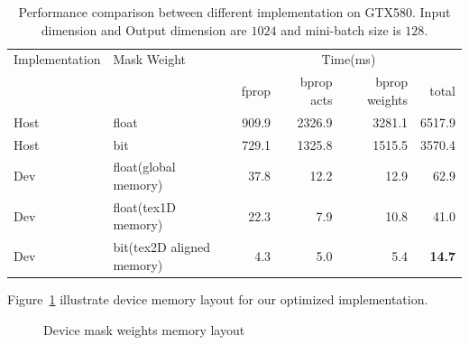 \documentclass[9pt]{article}
\begin{document}
\begin{table}[ht]
    \begin{center}
        \label{tab:imp_time}
        \begin{tabular}{|l|l|r|r|r|r|}
            \hline
            Implementation & Mask Weight& \multicolumn{4}{c|}{Time(ms)} \\
            \cline{3-6}
                           &            &     fprop & bprop acts & bprop weights & total \\
            \hline 
            Host & float & 909.9  & 2326.9  & 3281.1  & 6517.9  \\
            Host & bit   & 729.1  & 1325.8  & 1515.5  & 3570.4  \\
            \hline
            Dev & float(global memory)      & 37.8 & 12.2& 12.9& 62.9\\
            Dev & float(tex1D memory)       & 22.3 & 7.9 & 10.8& 41.0\\
            Dev & bit(tex2D aligned memory) & 4.3  & 5.0 & 5.4 & {\bf 14.7}\\
            \hline
        \end{tabular}
    \end{center}
    \caption{
        Performance comparison between different implementation on GTX580. Input dimension 
        and Output dimension are $1024$ and mini-batch size is $128$.
    }
\end{table}
Figure~\ref{fig:gpu_memory_2} illustrate device memory layout for our optimized implementation. 
\begin{figure}[ht]
   \label{fig:gpu_memory_2}
   \caption{
      Device mask weights memory layout
   }
\end{figure}
\end{document}

